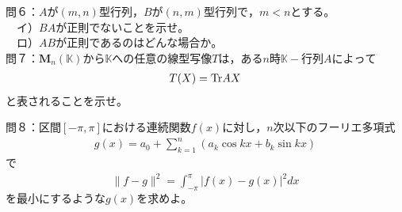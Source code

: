 \documentclass[dvipdfmx,uplatex,11pt]{jsarticle}
\begin{document}
%
%
%
\newpage
%
%
%
\noindent
問６：$Aが(m,n)型行列，Bが(n,m)型行列で，m<n とする。$\\
　イ）$BAが正則でないことを示せ。$ \\
　ロ）$ABが正則であるのはどんな場合か。$\\





















%
%
%
\newpage
%
%
%
\noindent
問７：$\bm{M}_n(\mathbb{K})から\mathbb{K}への任意の線型写像Tは，あるn時\mathbb{K}-行列Aによって$
\begin{eqnarray*}
T(X)={\rm Tr} AX
\end{eqnarray*}
と表されることを示せ。




















%
%
%
\newpage
%
%
%
\noindent
問８：$区間[-\pi ,\pi]における連続関数f(x)に対し，n次以下のフーリエ多項式$
\begin{eqnarray*}
g(x)=a_0+\sum^{n}_{k=1}(a_k \cos kx+b_k\sin kx)
\end{eqnarray*}
で
\begin{eqnarray*}
\| f-g \|^2=\int^{\pi}_{-\pi}|f(x)-g(x)|^2dx
\end{eqnarray*}
$を最小にするようなg(x)を求めよ。$
\end{document}
